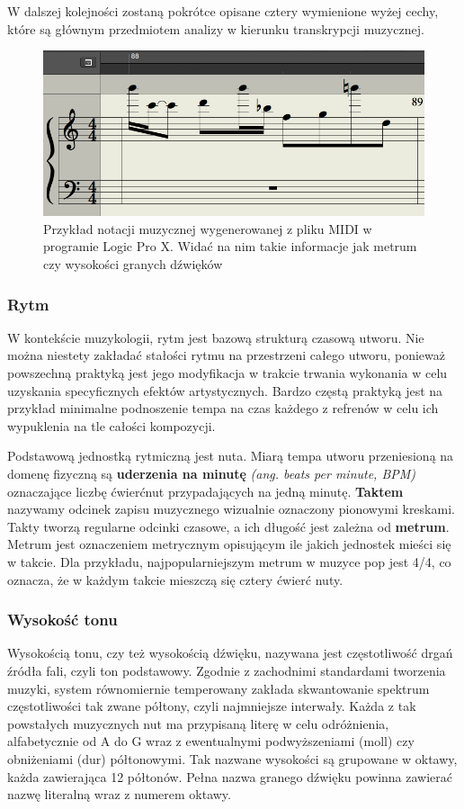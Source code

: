 \documentclass[12pt,a4paper,twoside]{mwart}
\begin{document}
W dalszej kolejności zostaną pokrótce opisane cztery wymienione wyżej cechy, które są głównym przedmiotem analizy w kierunku transkrypcji muzycznej.
\begin{figure}[H]
  \begin{center}
  \includegraphics[scale=0.5]{images/pieciolinia_logic.png}\\
  Przykład notacji muzycznej wygenerowanej z pliku MIDI w programie Logic Pro X. Widać na nim takie informacje jak metrum czy wysokości granych dźwięków
  \end{center}
  \end{figure}
\subsubsection{Rytm}
W kontekście muzykologii, rytm jest bazową strukturą czasową utworu. Nie można niestety zakładać stałości rytmu na przestrzeni całego utworu, ponieważ powszechną praktyką jest jego modyfikacja w trakcie trwania wykonania w celu uzyskania specyficznych efektów artystycznych. Bardzo częstą praktyką jest na przykład minimalne podnoszenie tempa na czas każdego z refrenów w celu ich wypuklenia na tle całości kompozycji.

Podstawową jednostką rytmiczną jest nuta. Miarą tempa utworu przeniesioną na domenę fizyczną są \textbf{uderzenia na minutę} \textit{(ang. beats per minute, BPM)} oznaczające liczbę ćwierćnut przypadających na jedną minutę. \textbf{Taktem} nazywamy odcinek zapisu muzycznego wizualnie oznaczony pionowymi kreskami. Takty tworzą regularne odcinki czasowe, a ich długość jest zależna od \textbf{metrum}. Metrum jest oznaczeniem metrycznym opisującym ile jakich jednostek mieści się w takcie. Dla przykładu, najpopularniejszym metrum w muzyce pop jest 4/4, co oznacza, że w każdym takcie mieszczą się cztery ćwierć nuty.

\subsubsection{Wysokość tonu}
Wysokością tonu, czy też wysokością dźwięku, nazywana jest częstotliwość drgań źródła fali, czyli ton podstawowy. Zgodnie z zachodnimi standardami tworzenia muzyki, system równomiernie temperowany zakłada skwantowanie spektrum częstotliwości tak zwane półtony, czyli najmniejsze interwały. Każda z tak powstałych muzycznych nut ma przypisaną literę w celu odróżnienia, alfabetycznie od A do G wraz z ewentualnymi podwyższeniami (moll) czy obniżeniami (dur) półtonowymi. Tak nazwane wysokości są grupowane w oktawy, każda zawierająca 12 półtonów. Pełna nazwa granego dźwięku powinna zawierać nazwę literalną wraz z numerem oktawy.
\end{document}
